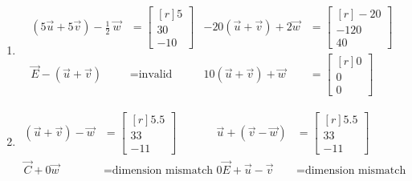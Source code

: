 \begin{enumerate}
    \item  \begin{align}
              (5\vec{u} + 5\vec{v}) - \frac{1}{2}\ \vec{w} & = \begin{bmatrix*}[r]
                                                                   5 \\ 30 \\ -10
                                                               \end{bmatrix*} &
              -20 (\vec{u} + \vec{v}) + 2\vec{w}           & = \begin{bmatrix*}[r]
                                                                   -20 \\ -120 \\ 40
                                                               \end{bmatrix*}    \\
              \vec{E} - (\vec{u} + \vec{v})                & = \text{invalid}      &
              10(\vec{u} + \vec{v}) + \vec{w}              & = \begin{bmatrix*}[r]
                                                                   0 \\ 0 \\ 0
                                                               \end{bmatrix*}
          \end{align}

    \item  \begin{align}
              (\vec{u} + \vec{v}) - \vec{w} & = \begin{bmatrix*}[r]
                                                    5.5 \\ 33 \\ -11
                                                \end{bmatrix*}       &
              \vec{u} + (\vec{v} - \vec{w}) & = \begin{bmatrix*}[r]
                                                    5.5 \\ 33 \\ -11
                                                \end{bmatrix*}          \\
              \vec{C} + 0\vec{w}            & = \text{dimension mismatch} &
              0\vec{E} + \vec{u} - \vec{v}  & = \text{dimension mismatch}
          \end{align}


\end{enumerate}
